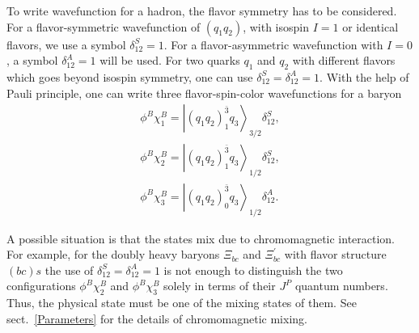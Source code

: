 \documentclass[12pt,onecolumn,floatfix,nofootinbib]{revtex4}
\begin{document}
To write wavefunction for a hadron, the flavor symmetry has to be
considered. For a flavor-symmetric wavefunction of $\left( q_{1}q_{2}\right)
$, with isospin $I=1$ or identical flavors, we use a symbol $\delta
_{12}^{S}=1$. For a flavor-asymmetric wavefunction with $I=0$, a symbol $%
\delta _{12}^{A}=1$ will be used. For two quarks $q_{1}$ and $q_{2}$ with
different flavors which goes beyond isospin symmetry, one can use $\delta
_{12}^{S}=\delta _{12}^{A}=1$. With the help of Pauli principle, one can
write three flavor-spin-color wavefunctions for a baryon
\begin{equation}
\begin{aligned} \phi^{B}\chi_{1}^{B}={\left|
{\left(q_{1}q_{2}\right)}_{1}^{\bar{3}} q_{3} \right\rangle}_{3/2}
\delta_{12}^{S}, \\ \phi^{B}\chi_{2}^{B}={\left|
{\left(q_{1}q_{2}\right)}_{1}^{\bar{3}} q_{3} \right\rangle}_{1/2}
\delta_{12}^{S}, \\ \phi^{B}\chi_{3}^{B}={\left|
{\left(q_{1}q_{2}\right)}_{0}^{\bar{3}} q_{3} \right\rangle}_{1/2}
\delta_{12}^{A}. \end{aligned}  \label{colorspinB}
\end{equation}

A possible situation is that the states mix due to chromomagnetic
interaction. For example, for the doubly heavy baryons $\Xi _{bc}$ and $\Xi
_{bc}^{\prime }$ with flavor structure $(bc)s$ the use of $\delta
_{12}^{S}=\delta _{12}^{A}=1$ is not enough to distinguish the two
configurations $\phi ^{B}\chi _{2}^{B}$ and $\phi ^{B}\chi _{3}^{B}$ solely
in terms of their $J^{P}$ quantum numbers. Thus, the physical state must be
one of the mixing states of them. See sect.~\ref{Parameters} for the details
of chromomagnetic mixing.
\end{document}

